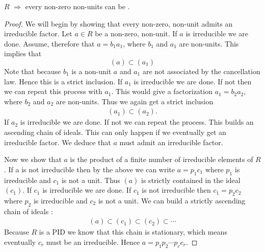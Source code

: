 \documentclass{article}
\begin{document}
\begin{thma}
$R$  $\Rightarrow$ every non-zero non-units can be .
\end{thma}
\begin{proof}
We will begin by showing that every non-zero, non-unit admits an irreducible factor.
Let $a \in R$ be a non-zero, non-unit. If $a$ is irreducible we are done. Assume, therefore that $a=b_{1} a_{1}$, where $b_{1}$ and $a_{1}$ are non-units. This implies that
$$(a) \subset\left(a_{1}\right)$$
Note that because $b_{1}$ is a non-unit $a$ and $a_{1}$ are not associated by the cancellation law. Hence this is a strict inclusion. If $a_{1}$ is irreducible we are done. If not then we can repeat this process with $a_{1}$. This would give a factorization $a_{1}=b_{2} a_{2}$, where $b_{2}$ and $a_{2}$ are non-units. Thus we again get a strict inclusion
\begin{align*}
\left(a_{1}\right) \subset\left(a_{2}\right) .
\end{align*}
If $a_{2}$ is irreducible we are done. If not we can repeat the process. This builds an ascending chain of ideals.  This can only happen if we eventually get an irreducible factor. We deduce that $a$ must admit an irreducible factor.

Now we show that $a$  is the product of a finite number of irreducible elements of  $R$. If  a is not irreducible then by the above we can write $a=p_{1} c_{1}$ where $p_{1}$ is irreducible and $c_{1}$ is not a unit. Thus $(a)$ is strictly contained in the ideal $(c_1)$. If $c_{1}$ is irreducible we are done. If $c_{1}$ is not irreducible then $c_{1}=p_{2} c_{2}$ where $p_{2}$ is irreducible and $c_{2}$ is not a unit. We can build a strictly ascending chain of ideals :
\begin{align*}
(a) \subset\left(c_{1}\right) \subset\left(c_{2}\right) \subset \cdots
\end{align*}
Because $R$ is a PID we know that this chain is stationary, which means eventually $c_{r}$ must be an irreducible. Hence $a=p_{1} p_{2} \cdots p_{r} c_{r}$.
\end{proof}
\end{document}
